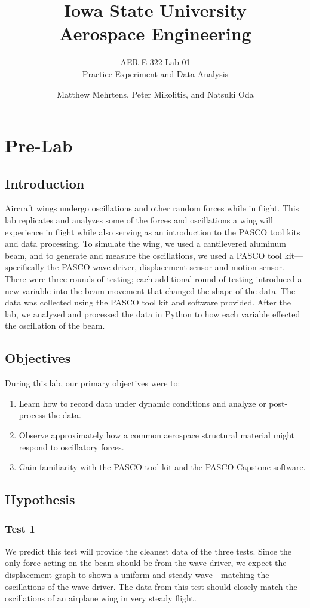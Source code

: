\documentclass[12 pt]{report}
\title{\textbf{Iowa State University
\\{\Large Aerospace Engineering}}}
\subtitle{AER E 322 Lab 01\\
		  Practice Experiment and Data Analysis}
\author{Matthew Mehrtens, Peter Mikolitis, and Natsuki Oda}
\begin{document}
\maketitle
\tableofcontents

\chapter{Pre-Lab} \label{pre-lab}
\section{Introduction} \label{introduction}
Aircraft wings undergo oscillations and other random forces while in flight. This lab replicates and analyzes some of the forces and oscillations a wing will experience in flight while also serving as an introduction to the PASCO tool kits and data processing. To simulate the wing, we used a cantilevered aluminum beam, and to generate and measure the oscillations, we used a PASCO tool kit---specifically the PASCO wave driver, displacement sensor and motion sensor. There were three rounds of testing; each additional round of testing introduced a new variable into the beam movement that changed the shape of the data. The data was collected using the PASCO tool kit and software provided. After the lab, we analyzed and processed the data in Python to how each variable effected the oscillation of the beam.

\section{Objectives} \label{objectives}
During this lab, our primary objectives were to:
\begin{enumerate}
	\item Learn how to record data under dynamic conditions and analyze or post-process the data.
	\item Observe approximately how a common aerospace structural material might respond to oscillatory forces.
	\item Gain familiarity with the PASCO tool kit and the PASCO Capstone software.
\end{enumerate}

\section{Hypothesis} \label{hypothesis}
\subsection{Test 1} \label{test_1}
We predict this test will provide the cleanest data of the three tests. Since the only force acting on the beam should be from the wave driver, we expect the displacement graph to shown a uniform and steady wave---matching the oscillations of the wave driver. The data from this test should closely match the oscillations of an airplane wing in very steady flight.
\end{document}
